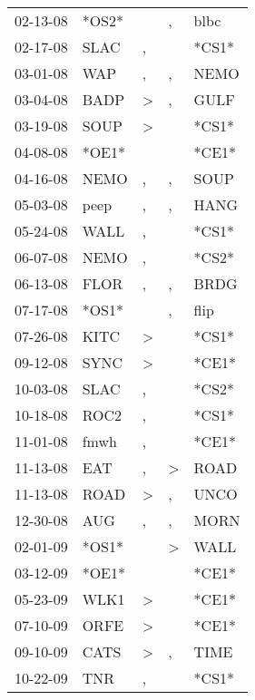 \begin{supertabular}{lllll}
 02-13-08 &  *OS2* &               &             , &   blbc \\
 02-17-08 &   SLAC &             , &               &  *CS1* \\
 03-01-08 &    WAP &             , &             , &   NEMO \\
 03-04-08 &   BADP &  \textgreater &             , &   GULF \\
 03-19-08 &   SOUP &  \textgreater &               &  *CS1* \\
 04-08-08 &  *OE1* &               &               &  *CE1* \\
 04-16-08 &   NEMO &             , &             , &   SOUP \\
 05-03-08 &   peep &             , &             , &   HANG \\
 05-24-08 &   WALL &             , &               &  *CS1* \\
 06-07-08 &   NEMO &             , &               &  *CS2* \\
 06-13-08 &   FLOR &             , &             , &   BRDG \\
 07-17-08 &  *OS1* &               &             , &   flip \\
 07-26-08 &   KITC &  \textgreater &               &  *CS1* \\
 09-12-08 &   SYNC &  \textgreater &               &  *CE1* \\
 10-03-08 &   SLAC &             , &               &  *CS2* \\
 10-18-08 &   ROC2 &             , &               &  *CS1* \\
 11-01-08 &   fmwh &             , &               &  *CE1* \\
 11-13-08 &    EAT &             , &  \textgreater &   ROAD \\
 11-13-08 &   ROAD &  \textgreater &             , &   UNCO \\
 12-30-08 &    AUG &             , &             , &   MORN \\
 02-01-09 &  *OS1* &               &  \textgreater &   WALL \\
 03-12-09 &  *OE1* &               &               &  *CE1* \\
 05-23-09 &   WLK1 &  \textgreater &               &  *CE1* \\
 07-10-09 &   ORFE &  \textgreater &               &  *CE1* \\
 09-10-09 &   CATS &  \textgreater &             , &   TIME \\
 10-22-09 &    TNR &             , &               &  *CS1* \\

\end{supertabular}
